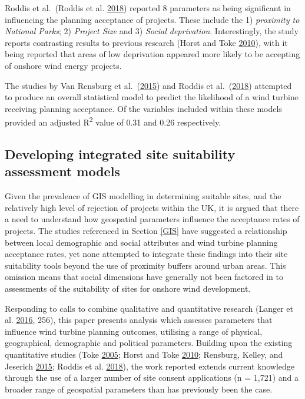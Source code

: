 \documentclass[a4paper,]{article}
\theoremstyle{definition}
\theoremstyle{definition}
\theoremstyle{definition}
\theoremstyle{remark}
\begin{document}
Roddis et al.~(Roddis et al. \protect\hyperlink{ref-Roddis2018}{2018})
reported 8 parameters as being significant in influencing the planning
acceptance of projects. These include the 1) \emph{proximity to National
Parks}; 2) \emph{Project Size} and 3) \emph{Social deprivation}.
Interestingly, the study reports contrasting results to previous
research (Horst and Toke \protect\hyperlink{ref-VanderHorst2010}{2010}),
with it being reported that areas of low deprivation appeared more
likely to be accepting of onshore wind energy projects.

The studies by Van Rensburg et
al.~(\protect\hyperlink{ref-VanRensburg20}{2015}) and Roddis et
al.~(\protect\hyperlink{ref-Roddis2018}{2018}) attempted to produce an
overall statistical model to predict the likelihood of a wind turbine
receiving planning acceptance. Of the variables included within these
models provided an adjusted R\textsuperscript{2} value of 0.31 and 0.26
respectively.

\hypertarget{developing-integrated-site-suitability-assessment-models}{%
\subsection{Developing integrated site suitability assessment
models}\label{developing-integrated-site-suitability-assessment-models}}

Given the prevalence of GIS modelling in determining suitable sites, and
the relatively high level of rejection of projects within the UK, it is
argued that there a need to understand how geospatial parameters
influence the acceptance rates of projects. The studies referenced in
Section \ref{GIS} have suggested a relationship between local
demographic and social attributes and wind turbine planning acceptance
rates, yet none attempted to integrate these findings into their site
suitability tools beyond the use of proximity buffers around urban
areas. This omission means that social dimensions have generally not
been factored in to assessments of the suitability of sites for onshore
wind development.

Responding to calls to combine qualitative and quantitative research
(Langer et al. \protect\hyperlink{ref-Langer2016}{2016}, 256), this
paper presents analysis which assesses parameters that influence wind
turbine planning outcomes, utilising a range of physical, geographical,
demographic and political parameters. Building upon the existing
quantitative studies (Toke \protect\hyperlink{ref-Toke2005}{2005}; Horst
and Toke \protect\hyperlink{ref-VanderHorst2010}{2010}; Rensburg,
Kelley, and Jeserich \protect\hyperlink{ref-VanRensburg20}{2015}; Roddis
et al. \protect\hyperlink{ref-Roddis2018}{2018}), the work reported
extends current knowledge through the use of a larger number of site
consent applications (n = 1,721) and a broader range of geospatial
parameters than has previously been the case.
\end{document}
